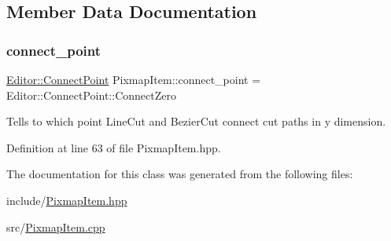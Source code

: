 \subsection{Member Data Documentation}
\mbox{\label{classPixmapItem_a3733ea98fc45c24acc1bc1552e969895}} 
\subsubsection{\texorpdfstring{connect\+\_\+point}{connect\_point}}
{\footnotesize\ttfamily \mbox{\hyperlink{namespaceEditor_aad9ecf07f59416285836e79f1b1d2bd8}{Editor\+::\+Connect\+Point}} Pixmap\+Item\+::connect\+\_\+point = Editor\+::\+Connect\+Point\+::\+Connect\+Zero\hspace{0.3cm}{\ttfamily [static]}}

Tells to which point Line\+Cut and Bezier\+Cut connect cut paths in y dimension. 

Definition at line 63 of file Pixmap\+Item.\+hpp.



The documentation for this class was generated from the following files\+:\begin{DoxyCompactItemize}
\item 
include/\mbox{\hyperlink{PixmapItem_8hpp}{Pixmap\+Item.\+hpp}}\item 
src/\mbox{\hyperlink{PixmapItem_8cpp}{Pixmap\+Item.\+cpp}}\end{DoxyCompactItemize}
